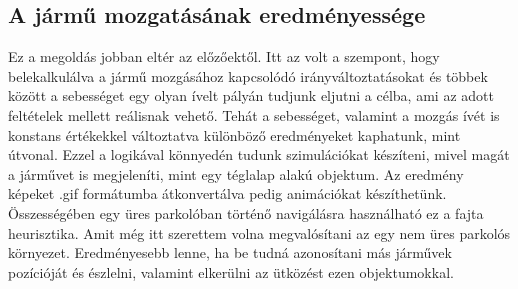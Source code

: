 \subsection{A jármű mozgatásának eredményessége}
Ez a megoldás jobban eltér az előzőektől. Itt az volt a szempont, hogy belekalkulálva a jármű mozgásához kapcsolódó irányváltoztatásokat és többek között a sebességet egy olyan ívelt pályán tudjunk eljutni a célba, ami az adott feltételek mellett reálisnak vehető. Tehát a sebességet, valamint a mozgás ívét is konstans értékekkel változtatva különböző eredményeket kaphatunk, mint útvonal. Ezzel a logikával könnyedén tudunk szimulációkat készíteni, mivel magát a járművet is megjeleníti, mint egy téglalap alakú objektum. Az eredmény képeket .gif formátumba átkonvertálva pedig animációkat készíthetünk. Összességében egy üres parkolóban történő navigálásra használható ez a fajta heurisztika. Amit még itt szerettem volna megvalósítani az egy nem üres parkolós környezet. Eredményesebb lenne, ha be tudná azonosítani más járművek pozícióját és észlelni, valamint elkerülni az ütközést ezen objektumokkal. 
